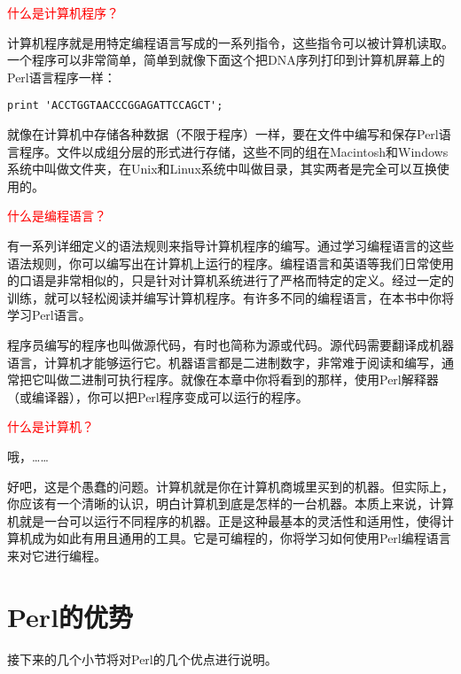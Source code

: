 \textcolor{red}{什么是计算机程序？}

\begin{adjustwidth}{4em}{}
\hspace*{2em}计算机程序就是用特定编程语言写成的一系列指令，这些指令可以被计算机读取。一个程序可以非常简单，简单到就像下面这个把DNA序列打印到计算机屏幕上的Perl语言程序一样：

\begin{lstlisting}
print 'ACCTGGTAACCCGGAGATTCCAGCT';
\end{lstlisting}

就像在计算机中存储各种数据（不限于程序）一样，要在文件中编写和保存Perl语言程序。文件以成组分层的形式进行存储，这些不同的组在Macintosh和Windows系统中叫做文件夹，在Unix和Linux系统中叫做目录，其实两者是完全可以互换使用的。
\end{adjustwidth}

\textcolor{red}{什么是编程语言？}

\begin{adjustwidth}{4em}{}
\hspace*{2em}有一系列详细定义的语法规则来指导计算机程序的编写。通过学习编程语言的这些语法规则，你可以编写出在计算机上运行的程序。编程语言和英语等我们日常使用的口语是非常相似的，只是针对计算机系统进行了严格而特定的定义。经过一定的训练，就可以轻松阅读并编写计算机程序。有许多不同的编程语言，在本书中你将学习Perl语言。

程序员编写的程序也叫做源代码，有时也简称为源或代码。源代码需要翻译成机器语言，计算机才能够运行它。机器语言都是二进制数字，非常难于阅读和编写，通常把它叫做二进制可执行程序。就像在本章中你将看到的那样，使用Perl解释器（或编译器），你可以把Perl程序变成可以运行的程序。
\end{adjustwidth}

\textcolor{red}{什么是计算机？}

\begin{adjustwidth}{4em}{}
\hspace*{2em}哦，……

好吧，这是个愚蠢的问题。计算机就是你在计算机商城里买到的机器。但实际上，你应该有一个清晰的认识，明白计算机到底是怎样的一台机器。本质上来说，计算机就是一台可以运行不同程序的机器。正是这种最基本的灵活性和适用性，使得计算机成为如此有用且通用的工具。它是可编程的，你将学习如何使用Perl编程语言来对它进行编程。
\end{adjustwidth}

\section{Perl的优势}
接下来的几个小节将对Perl的几个优点进行说明。

